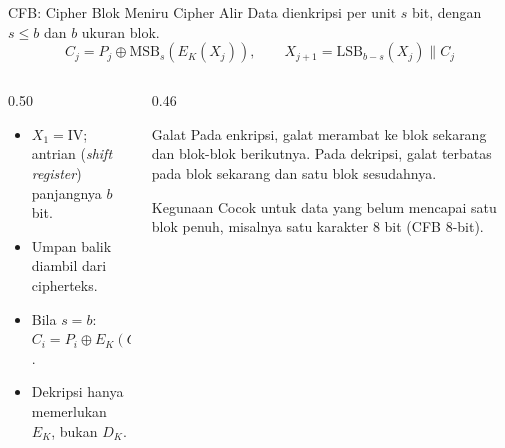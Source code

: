 \documentclass[aspectratio=169,11pt]{beamer}
\begin{document}
\begin{frame}{CFB: Cipher Blok Meniru Cipher Alir}
    \footnotesize
    Data dienkripsi per unit $s$ bit, dengan $s\le b$ dan $b$ ukuran blok.
    \[
        C_j = P_j \oplus \mathrm{MSB}_s(E_K(X_j)), \qquad
        X_{j+1} = \mathrm{LSB}_{b-s}(X_j) \parallel C_j
    \]
    \begin{columns}[T,onlytextwidth]
        \begin{column}{0.50\textwidth}
            \begin{itemize}
                \item $X_1=\mathrm{IV}$; antrian (\textit{shift register})
                      panjangnya $b$ bit.
                \item Umpan balik diambil dari cipherteks.
                \item Bila $s=b$: $C_i=P_i\oplus E_K(C_{i-1})$.
                \item Dekripsi hanya memerlukan $E_K$, bukan $D_K$.
            \end{itemize}
        \end{column}
        \begin{column}{0.46\textwidth}
            \begin{alertblock}{Galat}
                \footnotesize
                Pada enkripsi, galat merambat ke blok sekarang dan
                blok-blok berikutnya. Pada dekripsi, galat terbatas pada
                blok sekarang dan satu blok sesudahnya.
            \end{alertblock}
            \begin{exampleblock}{Kegunaan}
                \footnotesize
                Cocok untuk data yang belum mencapai satu blok penuh,
                misalnya satu karakter 8 bit (CFB 8-bit).
            \end{exampleblock}
        \end{column}
    \end{columns}
\end{frame}
\end{document}
